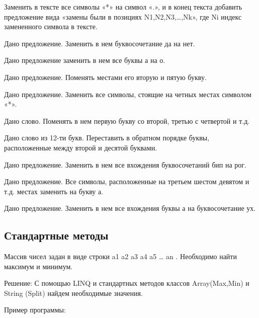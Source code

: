 \task Заменить в тексте все символы «*» на символ «.», и в конец
текста добавить предложение вида «замены были в позициях
  N1,N2,N3,…,Nk», где Ni индекс замененного символа в тексте.

\task Дано предложение. Заменить в нем буквосочетание да на нет.

\task Дано предложение заменить в нем все буквы а на о.

\task Дано предложение. Поменять местами его вторую и пятую букву.

\task Дано предложение. Заменить все символы, стоящие на четных местах
символом «*».

\task Дано слово. Поменять в нем первую букву со второй, третью с
четвертой и т.д.

\task Дано слово из 12-ти букв. Переставить в обратном порядке буквы,
расположенные между второй и десятой буквами.

\task Дано предложение. Заменить в нем все вхождения буквосочетаний
бип на рог.

\task Дано предложение. Все символы, расположенные на третьем шестом
девятом и т.д. местах заменить на букву а.

\task Дано предложение. Заменить в нем все вхождения буквы а на
буквосочетание ух.

\subsection{Стандартные методы}

Массив чисел задан в виде строки a1 a2 a3 a4 a5 … an . Необходимо
найти максимум и минимум.

Решение: С помощью LINQ и стандартных методов классов Array(Max,Min) и
String (Split) найдем необходимые значения.

Пример программы:




